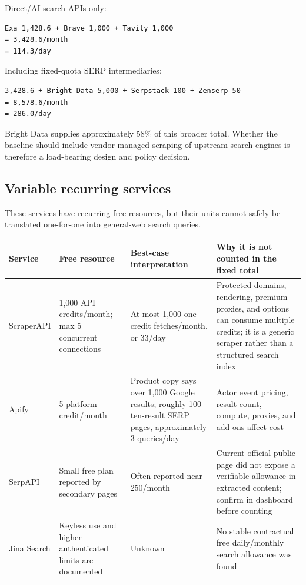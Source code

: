 \documentclass[11pt]{article}
\begin{document}
Direct/AI-search APIs only:

\begin{verbatim}
Exa 1,428.6 + Brave 1,000 + Tavily 1,000
= 3,428.6/month
= 114.3/day
\end{verbatim}

Including fixed-quota SERP intermediaries:

\begin{verbatim}
3,428.6 + Bright Data 5,000 + Serpstack 100 + Zenserp 50
= 8,578.6/month
= 286.0/day
\end{verbatim}

Bright Data supplies approximately 58\% of this broader total.  Whether the
baseline should include vendor-managed scraping of upstream search engines is
therefore a load-bearing design and policy decision.
\subsection*{Variable recurring services}
\label{sec:org96c94ca}

These services have recurring free resources, but their units cannot safely be
translated one-for-one into general-web search queries.

\begin{center}
\begin{tabular}{llll}
Service & Free resource & Best-case interpretation & Why it is not counted in the fixed total\\
\hline
ScraperAPI & 1,000 API credits/month; max 5 concurrent connections & At most 1,000 one-credit fetches/month, or 33/day & Protected domains, rendering, premium proxies, and options can consume multiple credits; it is a generic scraper rather than a structured search index\\
Apify & \char36{}5 platform credit/month & Product copy says over 1,000 Google results; roughly 100 ten-result SERP pages, approximately 3 queries/day & Actor event pricing, result count, compute, proxies, and add-ons affect cost\\
SerpAPI & Small free plan reported by secondary pages & Often reported near 250/month & Current official public page did not expose a verifiable allowance in extracted content; confirm in dashboard before counting\\
Jina Search & Keyless use and higher authenticated limits are documented & Unknown & No stable contractual free daily/monthly search allowance was found\\
\end{tabular}
\end{center}
\end{document}
